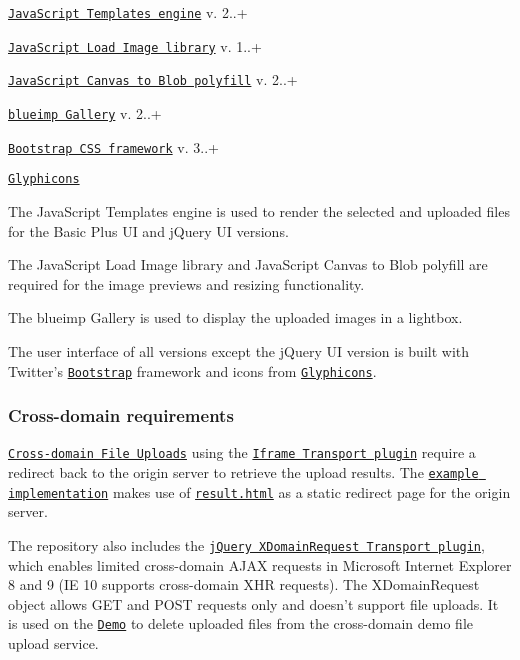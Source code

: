 \begin{DoxyItemize}
\item \href{https://github.com/blueimp/JavaScript-Templates}{\tt Java\-Script Templates engine} v. 2..+
\item \href{https://github.com/blueimp/JavaScript-Load-Image}{\tt Java\-Script Load Image library} v. 1..+
\item \href{https://github.com/blueimp/JavaScript-Canvas-to-Blob}{\tt Java\-Script Canvas to Blob polyfill} v. 2..+
\item \href{https://github.com/blueimp/Gallery}{\tt blueimp Gallery} v. 2..+
\item \href{http://getbootstrap.com/}{\tt Bootstrap C\-S\-S framework} v. 3..+
\item \href{http://glyphicons.com/}{\tt Glyphicons}
\end{DoxyItemize}

The Java\-Script Templates engine is used to render the selected and uploaded files for the Basic Plus U\-I and j\-Query U\-I versions.

The Java\-Script Load Image library and Java\-Script Canvas to Blob polyfill are required for the image previews and resizing functionality.

The blueimp Gallery is used to display the uploaded images in a lightbox.

The user interface of all versions except the j\-Query U\-I version is built with Twitter's \href{http://getbootstrap.com/}{\tt Bootstrap} framework and icons from \href{http://glyphicons.com/}{\tt Glyphicons}.

\subsubsection*{Cross-\/domain requirements}

\href{https://github.com/blueimp/jQuery-File-Upload/wiki/Cross-domain-uploads}{\tt Cross-\/domain File Uploads} using the \href{https://github.com/blueimp/jQuery-File-Upload/blob/master/js/jquery.iframe-transport.js}{\tt Iframe Transport plugin} require a redirect back to the origin server to retrieve the upload results. The \href{https://github.com/blueimp/jQuery-File-Upload/blob/master/js/main.js}{\tt example implementation} makes use of \href{https://github.com/blueimp/jQuery-File-Upload/blob/master/cors/result.html}{\tt result.\-html} as a static redirect page for the origin server.

The repository also includes the \href{https://github.com/blueimp/jQuery-File-Upload/blob/master/js/cors/jquery.xdr-transport.js}{\tt j\-Query X\-Domain\-Request Transport plugin}, which enables limited cross-\/domain A\-J\-A\-X requests in Microsoft Internet Explorer 8 and 9 (I\-E 10 supports cross-\/domain X\-H\-R requests). The X\-Domain\-Request object allows G\-E\-T and P\-O\-S\-T requests only and doesn't support file uploads. It is used on the \href{http://blueimp.github.io/jQuery-File-Upload/}{\tt Demo} to delete uploaded files from the cross-\/domain demo file upload service.

